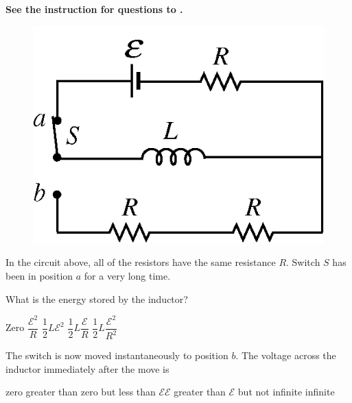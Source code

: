\textbf{See the instruction for questions  to .}

\begin{figure}[H]
\centering
\includegraphics[scale=0.25]{images/img-007-022.png}
\end{figure}

In the circuit above, all of the resistors have the same resistance $R$. Switch $S$ has been in position $a$ for a very long time.

\begin{questions}\setcounter{question}{10}\question
What is the energy stored by the inductor?

\begin{oneparchoices}
\choice Zero
\choice $\dfrac{\mathcal{E}^{2}}{R}$
\choice $\dfrac{1}{2} L \mathcal{E}^{2}$
\choice $\dfrac{1}{2} L \dfrac{\mathcal{E}}{R}$
\choice $\dfrac{1}{2} L \dfrac{\mathcal{E}^{2}}{R^{2}}$
\end{oneparchoices}\end{questions}

\begin{questions}\setcounter{question}{11}\question
The switch is now moved instantaneously to position $b$. The voltage across the inductor immediately after the move is

\begin{choices}
\choice zero
\choice greater than zero but less than $\mathcal{E}$\choice $\mathcal{E}$
\choice greater than $\mathcal{E}$ but not infinite
\choice infinite
\end{choices}\end{questions}

